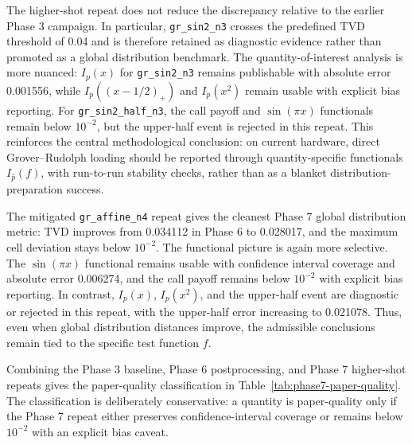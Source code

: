 The higher-shot repeat does not reduce the discrepancy relative to the earlier
Phase 3 campaign. In particular, \texttt{gr\_sin2\_n3} crosses the predefined
TVD threshold of 0.04 and is therefore retained as diagnostic evidence rather
than promoted as a global distribution benchmark. The quantity-of-interest
analysis is more nuanced: \(I_p(x)\) for \texttt{gr\_sin2\_n3} remains
publishable with absolute error 0.001556, while
\(I_p((x-1/2)_+)\) and \(I_p(x^2)\) remain usable with explicit bias reporting.
For \texttt{gr\_sin2\_half\_n3}, the call payoff and \(\sin(\pi x)\)
functionals remain below \(10^{-2}\), but the upper-half event is rejected in
this repeat. This reinforces the central methodological conclusion: on current
hardware, direct Grover--Rudolph loading should be reported through
quantity-specific functionals \(I_{\hat p}(f)\), with run-to-run stability
checks, rather than as a blanket distribution-preparation success.

The mitigated \texttt{gr\_affine\_n4} repeat gives the cleanest Phase 7 global
distribution metric: TVD improves from 0.034112 in Phase 6 to 0.028017, and the
maximum cell deviation stays below \(10^{-2}\). The functional picture is again
more selective. The \(\sin(\pi x)\) functional remains usable with confidence
interval coverage and absolute error 0.006274, and the call payoff remains
below \(10^{-2}\) with explicit bias reporting. In contrast, \(I_p(x)\),
\(I_p(x^2)\), and the upper-half event are diagnostic or rejected in this
repeat, with the upper-half error increasing to 0.021078. Thus, even when
global distribution distances improve, the admissible conclusions remain tied
to the specific test function \(f\).

Combining the Phase 3 baseline, Phase 6 postprocessing, and Phase 7
higher-shot repeats gives the paper-quality classification in
Table~\ref{tab:phase7-paper-quality}. The classification is deliberately
conservative: a quantity is paper-quality only if the Phase 7 repeat either
preserves confidence-interval coverage or remains below \(10^{-2}\) with an
explicit bias caveat.

